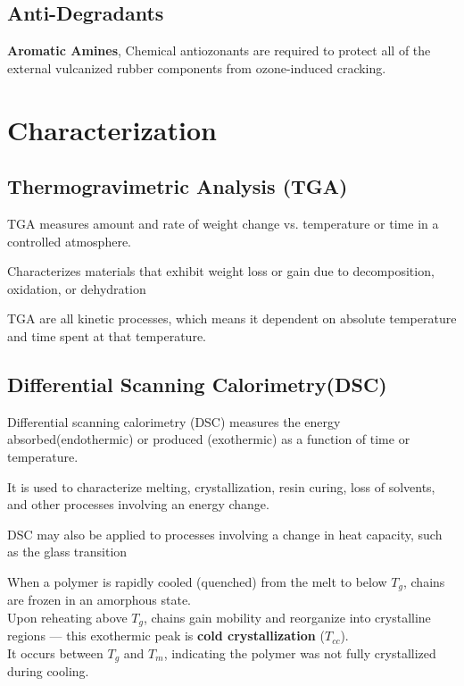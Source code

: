 \documentclass{NoteThesis/note-thesis}
\begin{document}
\subsection{Anti-Degradants}

\textbf{Aromatic Amines}, Chemical antiozonants are required to protect all of the external vulcanized rubber components from ozone-induced cracking.

\section{Characterization}

\subsection{Thermogravimetric Analysis (TGA)}

TGA measures amount and rate of weight change vs. temperature or time in a controlled atmosphere.

Characterizes materials that exhibit weight loss or gain due to decomposition, oxidation, or dehydration

\begin{mynote_env}[frametitle={Cautions}]
    TGA are all kinetic processes, which means it dependent on absolute temperature and time spent at that temperature.
\end{mynote_env}

\subsection{Differential Scanning Calorimetry(DSC)}

Differential scanning calorimetry (DSC) measures the energy absorbed(endothermic) or produced (exothermic) as a function of time or temperature.


It is used to characterize melting, crystallization, resin curing, loss of solvents, and other processes involving an energy change.

DSC may also be applied to processes involving a change in heat capacity, such as the glass transition

\begin{mynote_env}[frametitle={Cold Crystallization}]
    When a polymer is rapidly cooled (quenched) from the melt to below $T_g$, chains are frozen in an amorphous state.\\
    Upon reheating above $T_g$, chains gain mobility and reorganize into crystalline regions — this exothermic peak is \textbf{cold crystallization} ($T_{cc}$).\\
    It occurs between $T_g$ and $T_m$, indicating the polymer was not fully crystallized during cooling.
\end{mynote_env}
\end{document}
